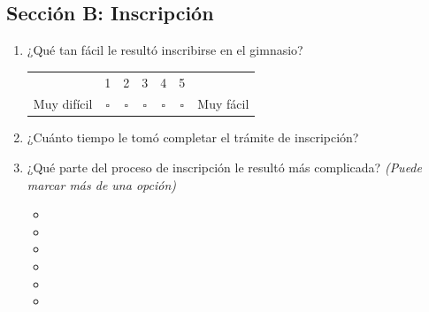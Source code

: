 \subsection*{Sección B: Inscripción}
\begin{enumerate}[resume*=cuest]
  \item ¿Qué tan fácil le resultó inscribirse en el gimnasio?\\[0.3em]
  \begin{tabular}{@{}lccccc l@{}}
    & 1 & 2 & 3 & 4 & 5 & \\
    Muy difícil & $\square$ & $\square$ & $\square$ & $\square$ & $\square$ & Muy fácil
  \end{tabular}

  \item ¿Cuánto tiempo le tomó completar el trámite de inscripción?\\[0.3em]
  \quad {}\quad {}\quad {}\quad {}

  \item ¿Qué parte del proceso de inscripción le resultó más complicada? \emph{(Puede marcar más de una opción)}
    \begin{itemize}[label={}, leftmargin=0pt, itemsep=0pt]
    \item {}
    \item {}
    \item {}
    \item {}
    \item {}
    \item {}
  \end{itemize}
\end{enumerate}

